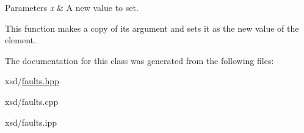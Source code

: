 \begin{DoxyParams}{Parameters}
{\em x} & A new value to set.\\
\hline
\end{DoxyParams}
This function makes a copy of its argument and sets it as the new value of the element. 

The documentation for this class was generated from the following files:\begin{DoxyCompactItemize}
\item 
xsd/\hyperlink{faults_8hpp}{faults.hpp}\item 
xsd/faults.cpp\item 
xsd/faults.ipp\end{DoxyCompactItemize}
